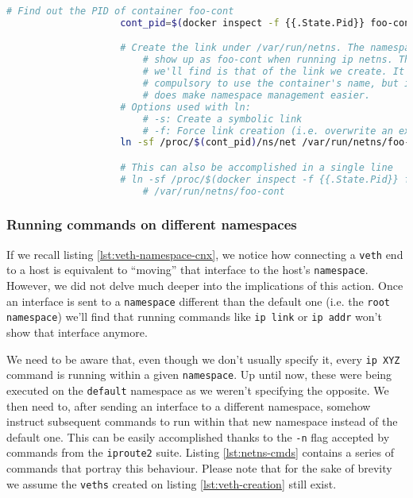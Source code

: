                 \begin{lstlisting}[language = bash, caption = Linking a container's network namespace to \texttt{/var/run/netns}., label = lst:ns-link]
                    # Find out the PID of container foo-cont
                    cont_pid=$(docker inspect -f {{.State.Pid}} foo-cont)

                    # Create the link under /var/run/netns. The namespace will
                        # show up as foo-cont when running ip netns. The name
                        # we'll find is that of the link we create. It is NOT
                        # compulsory to use the container's name, but it
                        # does make namespace management easier.
                    # Options used with ln:
                        # -s: Create a symbolic link
                        # -f: Force link creation (i.e. overwrite an existing link)
                    ln -sf /proc/$(cont_pid)/ns/net /var/run/netns/foo-cont

                    # This can also be accomplished in a single line
                    # ln -sf /proc/$(docker inspect -f {{.State.Pid}} foo-cont)/ns/net\ 
                        # /var/run/netns/foo-cont
                \end{lstlisting}

            \subsubsection{Running commands on different namespaces}
                If we recall listing \ref{lst:veth-namespace-cnx}, we notice how connecting a \texttt{veth} end to a host is equivalent to ``moving'' that interface to the host's \texttt{namespace}. However, we did not delve much deeper into the implications of this action. Once an interface is sent to a \texttt{namespace} different than the default one (i.e. the \texttt{root namespace}) we'll find that running commands like \texttt{ip link} or \texttt{ip addr} won't show that interface anymore.

                We need to be aware that, even though we don't usually specify it, every \texttt{ip XYZ} command is running within a given \texttt{namespace}. Up until now, these were being executed on the \texttt{default} namespace as we weren't specifying the opposite. We then need to, after sending an interface to a different namespace, somehow instruct subsequent commands to run within that new namespace instead of the default one. This can be easily accomplished thanks to the \texttt{-n} flag accepted by commands from the \texttt{iproute2} suite. Listing \ref{lst:netns-cmds} contains a series of commands that portray this behaviour. Please note that for the sake of brevity we assume the \texttt{veths} created on listing \ref{lst:veth-creation} still exist.

